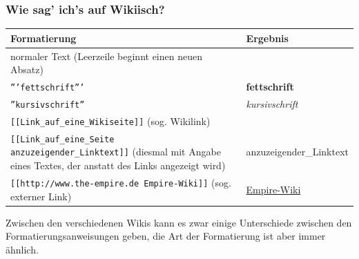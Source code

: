 \documentclass{beamer}              %
\begin{document}
\begin{frame}
  \frametitle{Wie sag’ ich’s auf Wikiisch?}
  \begin{longtable}{|l|l|}
    \hline
    \textbf{Formatierung                                           } & \textbf{Ergebnis                      } \\ 
    \hline
     
    normaler Text (Leerzeile beginnt einen neuen Absatz)             &                                \\ 
    \hline
     
    \texttt{'''fettschrift'''}                                           & \textbf{fettschrift}                \\ 
    \hline
     
    \texttt{''kursivschrift''}                                           & \emph{kursivschrift}                \\ 
    \hline
     
    \texttt{[[Link\_auf\_eine\_Wikiseite]]} (sog. Wikilink)          &     \\ 
    \hline
     
    \texttt{[[Link\_auf\_eine\_Seite anzuzeigender\_Linktext]]} (diesmal mit Angabe eines Textes, der anstatt des Links angezeigt wird)                    &  anzuzeigender\_Linktext \\ 
    \hline
     
    \texttt{[[http://www.the-empire.de Empire-Wiki]]} (sog. externer Link)     & \href{http://www.the-empire.de}{ Empire-Wiki} \\ 
    \hline
     
  \end{longtable}

  Zwischen den verschiedenen Wikis kann es zwar einige Unterschiede zwischen den Formatierungsanweisungen geben, die Art der Formatierung ist aber immer ähnlich.
\end{frame}
\end{document}
